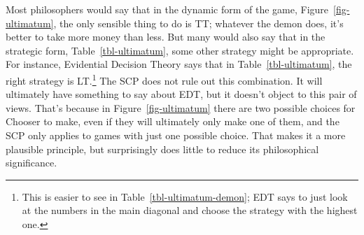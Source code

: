 \documentclass[
  10pt,
  letterpaper,
  DIV=11,
  numbers=noendperiod,
  twoside]{scrartcl}
\begin{document}
\begin{table}

\caption{\label{tbl-ultimatum}Two representations of the strategic form
of ultimatum game}

\begin{minipage}[t]{0.50\linewidth}



\end{minipage}%
%
\begin{minipage}[t]{0.50\linewidth}



\end{minipage}%

\end{table}%

Most philosophers would say that in the dynamic form of the game,
Figure~\ref{fig-ultimatum}, the only sensible thing to do is TT;
whatever the demon does, it's better to take more money than less. But
many would also say that in the strategic form,
Table~\ref{tbl-ultimatum}, some other strategy might be appropriate. For
instance, Evidential Decision Theory says that in
Table~\ref{tbl-ultimatum}, the right strategy is LT.\footnote{This is
  easier to see in Table~\ref{tbl-ultimatum-demon}; EDT says to just
  look at the numbers in the main diagonal and choose the strategy with
  the highest one.} The SCP does not rule out this combination. It will
ultimately have something to say about EDT, but it doesn't object to
this pair of views. That's because in Figure~\ref{fig-ultimatum} there
are two possible choices for Chooser to make, even if they will
ultimately only make one of them, and the SCP only applies to games with
just one possible choice. That makes it a more plausible principle, but
surprisingly does little to reduce its philosophical significance.
\end{document}
